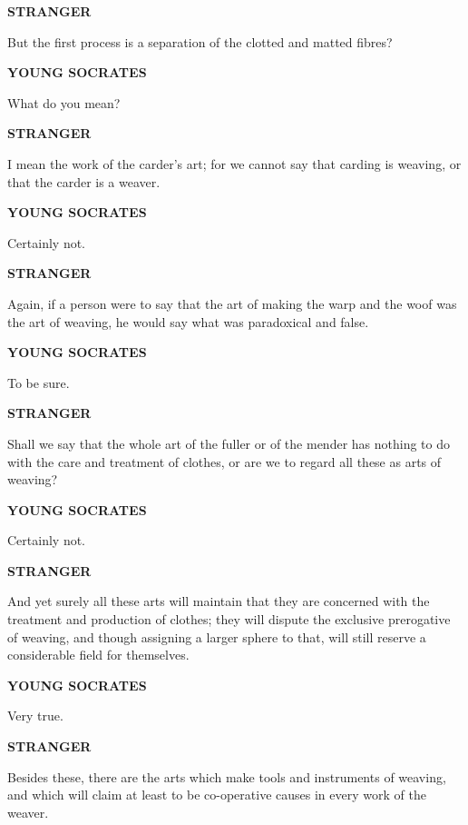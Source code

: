 \documentclass[11pt,letter]{article}
\begin{document}
\par \textbf{STRANGER}
\par   But the first process is a separation of the clotted and matted fibres?

\par \textbf{YOUNG SOCRATES}
\par   What do you mean?

\par \textbf{STRANGER}
\par   I mean the work of the carder's art; for we cannot say that carding is weaving, or that the carder is a weaver.

\par \textbf{YOUNG SOCRATES}
\par   Certainly not.

\par \textbf{STRANGER}
\par   Again, if a person were to say that the art of making the warp and the woof was the art of weaving, he would say what was paradoxical and false.

\par \textbf{YOUNG SOCRATES}
\par   To be sure.

\par \textbf{STRANGER}
\par   Shall we say that the whole art of the fuller or of the mender has nothing to do with the care and treatment of clothes, or are we to regard all these as arts of weaving?

\par \textbf{YOUNG SOCRATES}
\par   Certainly not.

\par \textbf{STRANGER}
\par   And yet surely all these arts will maintain that they are concerned with the treatment and production of clothes; they will dispute the exclusive prerogative of weaving, and though assigning a larger sphere to that, will still reserve a considerable field for themselves.

\par \textbf{YOUNG SOCRATES}
\par   Very true.

\par \textbf{STRANGER}
\par   Besides these, there are the arts which make tools and instruments of weaving, and which will claim at least to be co-operative causes in every work of the weaver.
\end{document}
